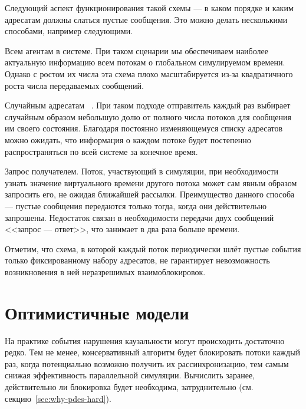 Следующий аспект функционирования такой схемы --- в каком порядке  и каким адресатам должны слаться пустые сообщения. Это можно делать несколькими способами, например следующими.

\begin{description*}
\item[Всем агентам в системе.] При таком сценарии мы обеспечиваем наиболее актуальную информацию всем потокам о глобальном симулируемом времени. Однако с ростом их числа эта схема плохо масштабируется из-за квадратичного роста числа передаваемых сообщений.

\item[Случайным адресатам]~\cite{graphite2010}. При таком подходе отправитель каждый раз выбирает случайным образом небольшую долю от полного числа потоков для сообщения им своего состояния. Благодаря постоянно изменяющемуся списку адресатов можно ожидать, что информация о каждом потоке будет постепенно распространяться по всей системе за конечное время.

\item[Запрос получателем.] Поток, участвующий в симуляции, при необходимости узнать значение виртуального времени другого потока может сам явным образом запросить его, не ожидая ближайшей рассылки. Преимущество данного способа --- пустые сообщения передаются только тогда, когда они действительно запрошены. Недостаток связан в необходимости передачи двух сообщений <<запрос --- ответ>>, что занимает в два раза больше времени.
\end{description*}

Отметим, что схема, в которой каждый поток периодически шлёт пустые события только фиксированному набору адресатов, не гарантирует невозможность возникновения в ней неразрешимых взаимоблокировок.

\section{Оптимистичные модели}


На практике события нарушения каузальности могут происходить достаточно редко. Тем не менее, консервативный алгоритм будет блокировать потоки каждый раз, когда потенциально возможно получить их рассинхронизацию, тем самым снижая эффективность параллельной симуляции. Вычислить заранее, действительно ли блокировка будет необходима, затруднительно (см. секцию~\ref{sec:why-pdes-hard}).

